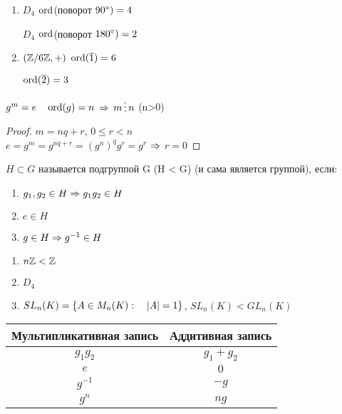 \documentclass[12pt, fleqn]{article}
\begin{document}
\begin{example}
    \begin{enumerate}                               
    	\item $D_4$ $\mathop{\rm ord}\nolimits$(поворот $90\degree) =4$
    	
    	$D_4$ $\mathop{\rm ord}\nolimits$(поворот $180\degree) =2$
    	\item $(\mathbb{Z} /6 \mathbb{Z}, +)$ $\mathop{\rm ord}\nolimits(\overline{1})=6$
    	
    	$\mathop{\rm ord}\nolimits(\overline{2})=3$
	\end{enumerate} 
\end{example}

\begin{utv}
    $g^m=e \quad \mathop{\rm ord}\nolimits(g)=n$ $\Rightarrow$ $m \devides n$ (n>0)
\end{utv}
\begin{proof}
    $m=n q+r$, $0 \leqslant r < n$
    \\
    $e=g^m=g^{n q + r}=(g^n)^q g^r=g^r$ $\Rightarrow$ $r=0$
\end{proof}

\begin{definition}
    $H \subset G$ называется подгруппой G (H < G) (и сама является группой), если:
    \begin{enumerate}                               
    	\item $g_1,g_2 \in H \Rightarrow g_1 g_2 \in H$
    	\item $e \in H$
    	\item $g \in H \Rightarrow g^{-1} \in H$
	\end{enumerate} 
\end{definition}

\begin{example}
    \begin{enumerate}                               
    	\item $n\mathbb{Z} < \mathbb{Z}$
    	\item $D_4$
    	\item $SL_n(K)=\{A \in M_n(K): \quad |A|=1\}$, $SL_n(K)<GL_n(K)$
	\end{enumerate} 
\end{example}

\begin{tabular} {c|c}
	Мультипликативная запись & Аддитивная запись\\ \hline 
	$g_1 g_2$ & $g_1 + g_2$\\
	$e$ & $0$\\
	$g^{-1}$ & $-g$\\
    $g^n$ & $n g$ 
\end{tabular}
\end{document}
